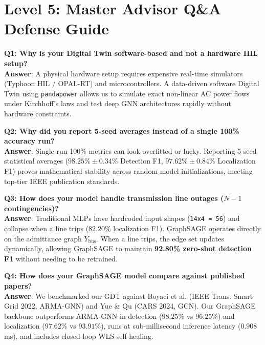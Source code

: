 \documentclass[11pt,a4paper]{article}
\begin{document}
\section{Level 5: Master Advisor Q\&A Defense Guide}

\begin{mdframed}[style=qastyle]
\textbf{Q1: Why is your Digital Twin software-based and not a hardware HIL setup?}\\
\textbf{Answer}: A physical hardware setup requires expensive real-time simulators (Typhoon HIL / OPAL-RT) and microcontrollers. A data-driven software Digital Twin using \texttt{pandapower} allows us to simulate exact non-linear AC power flows under Kirchhoff's laws and test deep GNN architectures rapidly without hardware constraints.
\end{mdframed}

\begin{mdframed}[style=qastyle]
\textbf{Q2: Why did you report 5-seed averages instead of a single 100\% accuracy run?}\\
\textbf{Answer}: Single-run 100\% metrics can look overfitted or lucky. Reporting 5-seed statistical averages ($98.25\% \pm 0.34\%$ Detection F1, $97.62\% \pm 0.84\%$ Localization F1) proves mathematical stability across random model initializations, meeting top-tier IEEE publication standards.
\end{mdframed}

\begin{mdframed}[style=qastyle]
\textbf{Q3: How does your model handle transmission line outages ($N-1$ contingencies)?}\\
\textbf{Answer}: Traditional MLPs have hardcoded input shapes (\texttt{14x4 = 56}) and collapse when a line trips ($82.20\%$ localization F1). GraphSAGE operates directly on the admittance graph $Y_{\text{bus}}$. When a line trips, the edge set updates dynamically, allowing GraphSAGE to maintain \textbf{92.80\% zero-shot detection F1} without needing to be retrained.
\end{mdframed}

\begin{mdframed}[style=qastyle]
\textbf{Q4: How does your GraphSAGE model compare against published papers?}\\
\textbf{Answer}: We benchmarked our GDT against Boyaci et al. (IEEE Trans. Smart Grid 2022, ARMA-GNN) and Yue \& Qu (CARS 2024, GCN). Our GraphSAGE backbone outperforms ARMA-GNN in detection ($98.25\%$ vs $96.25\%$) and localization ($97.62\%$ vs $93.91\%$), runs at sub-millisecond inference latency ($0.908$ ms), and includes closed-loop WLS self-healing.
\end{mdframed}
\end{document}
